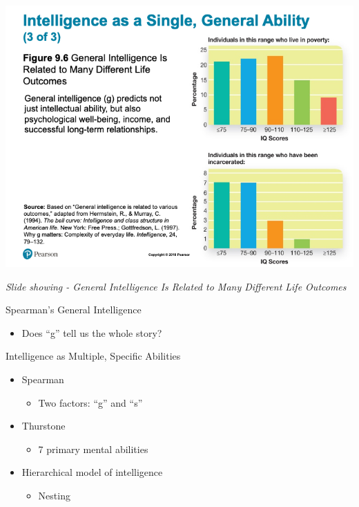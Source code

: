 \documentclass[
]{book}
\providecommand{\tightlist}{%
  \setlength{\itemsep}{0pt}\setlength{\parskip}{0pt}}
\begin{document}
\begin{reflect}
\includegraphics{assets/unit_2/slide_24.png}

\emph{Slide showing - General Intelligence Is Related to Many Different Life Outcomes}

Spearman's General Intelligence

\begin{itemize}
\tightlist
\item
  Does ``g'' tell us the whole story?
\end{itemize}

Intelligence as Multiple, Specific Abilities

\begin{itemize}
\tightlist
\item
  Spearman

  \begin{itemize}
  \tightlist
  \item
    Two factors: ``g'' and ``s''\\
  \end{itemize}
\item
  Thurstone

  \begin{itemize}
  \tightlist
  \item
    7 primary mental abilities\\
  \end{itemize}
\item
  Hierarchical model of intelligence

  \begin{itemize}
  \tightlist
  \item
    Nesting
  \end{itemize}
\end{itemize}


\end{reflect}
\end{document}
